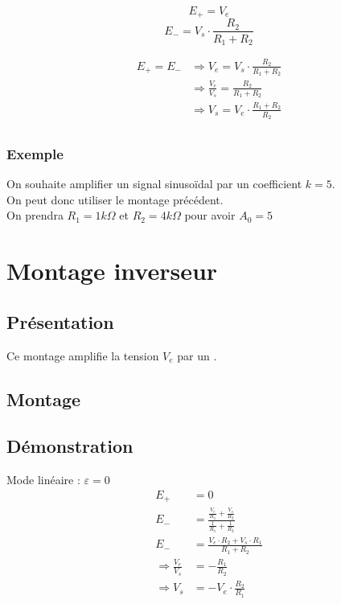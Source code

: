 $$E_+=V_e$$
$$E_-=V_s \cdot \frac{R_2}{R_1+R_2}$$

\begin{align}
E_+ = E_- &\Rightarrow V_e = V_s \cdot \frac{R_2}{R_1+R_2}\\
 &\Rightarrow \frac{V_e}{V_s} = \frac{R_2}{R_1+R_2}\\
 &\Rightarrow V_s = V_e \cdot \frac{R_1+R_2}{R_2} \\
\end{align}


\subsection{Exemple}


\begin{exemple}
On souhaite amplifier un signal sinusoïdal par un coefficient $k=5$.\\
On peut donc utiliser le montage précédent. \\
On prendra $R_1=1 k\Omega$ et $R_2=4k\Omega$ pour avoir $A_0=5$
\end{exemple}


\chapter{Montage inverseur}
\section{Présentation}

Ce montage amplifie la tension $V_e$ par un .

\section{Montage}


\section{Démonstration}

Mode linéaire : $\varepsilon = 0$
\begin{align}
E_+&=0 \\
E_-&= \frac{ \frac{V_e}{R_1}+\frac{V_s}{R_2} } { \frac{1}{R_1} + \frac{1}{R_2}} \\
E_-&=\frac{V_e \cdot R_2 + V_s \cdot R_1}{R_1 + R_2} \\
\Rightarrow \frac{V_e}{V_s} &= -\frac{R_1}{R_2}\\
\Rightarrow V_s &= -V_e \cdot \frac{R_2}{R_1} 
\end{align}


